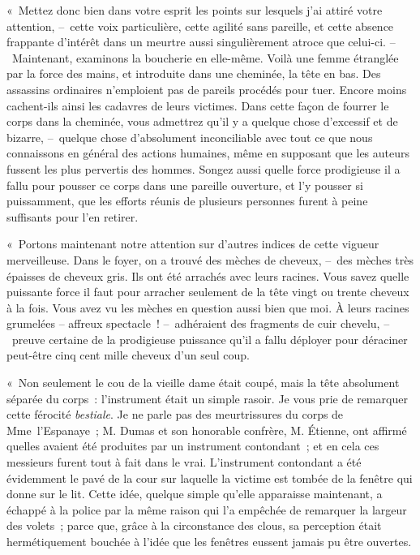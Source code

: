 \documentclass[french,twoside]{book} %
\begin{document}
« Mettez donc bien dans votre esprit les points sur lesquels j’ai attiré votre attention, – cette voix particulière, cette agilité sans pareille, et cette absence frappante d’intérêt dans un meurtre aussi singulièrement atroce que celui-ci. – Maintenant, examinons la boucherie en elle-même. Voilà une femme étranglée par la force des mains, et introduite dans une cheminée, la tête en bas. Des assassins ordinaires n’emploient pas de pareils procédés pour tuer. Encore moins cachent-ils ainsi les cadavres de leurs victimes. Dans cette façon de fourrer le corps dans la cheminée, vous admettrez qu’il y a quelque chose d’excessif et de bizarre, – quelque chose d’absolument inconciliable avec tout ce que nous connaissons en général des actions humaines, même en supposant que les auteurs fussent les plus pervertis des hommes. Songez aussi quelle force prodigieuse il a fallu pour pousser ce corps dans une pareille ouverture, et l’y pousser si puissamment, que les efforts réunis de plusieurs personnes furent à peine suffisants pour l’en retirer.\par
« Portons maintenant notre attention sur d’autres indices de cette vigueur merveilleuse. Dans le foyer, on a trouvé des mèches de cheveux, – des mèches très épaisses de cheveux gris. Ils ont été arrachés avec leurs racines. Vous savez quelle puissante force il faut pour arracher seulement de la tête vingt ou trente cheveux à la fois. Vous avez vu les mèches en question aussi bien que moi. À leurs racines grumelées – affreux spectacle ! – adhéraient des fragments de cuir chevelu, – preuve certaine de la prodigieuse puissance qu’il a fallu déployer pour déraciner peut-être cinq cent mille cheveux d’un seul coup.\par
« Non seulement le cou de la vieille dame était coupé, mais la tête absolument séparée du corps : l’instrument était un simple rasoir. Je vous prie de remarquer cette férocité \emph{bestiale}. Je ne parle pas des meurtrissures du corps de Mme l’Espanaye ; M. Dumas et son honorable confrère, M. Étienne, ont affirmé quelles avaient été produites par un instrument contondant ; et en cela ces messieurs furent tout à fait dans le vrai. L’instrument contondant a été évidemment le pavé de la cour sur laquelle la victime est tombée de la fenêtre qui donne sur le lit. Cette idée, quelque simple qu’elle apparaisse maintenant, a échappé à la police par la même raison qui l’a empêchée de remarquer la largeur des volets ; parce que, grâce à la circonstance des clous, sa perception était hermétiquement bouchée à l’idée que les fenêtres eussent jamais pu être ouvertes.\par
\end{document}
